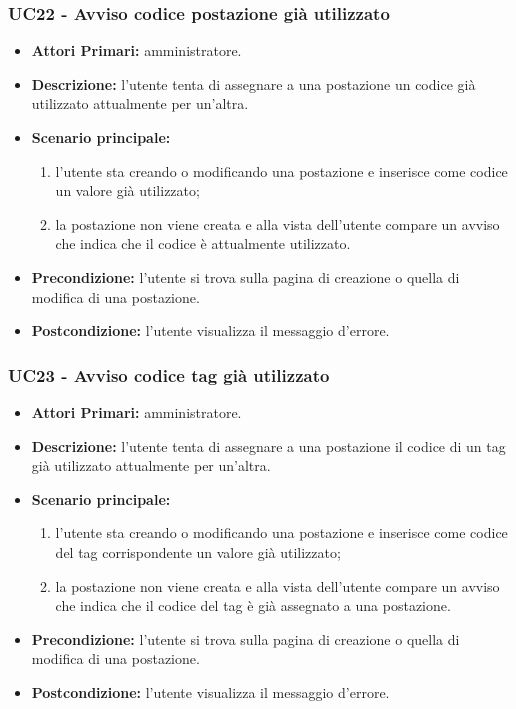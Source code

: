 \subsubsection{UC22 - Avviso codice postazione già utilizzato}
\begin{itemize}
	\item\textbf{Attori Primari:}
	amministratore.
	\item\textbf{Descrizione:}
	l'utente tenta di assegnare a una postazione un codice già utilizzato attualmente per un'altra.
	\item\textbf{Scenario principale:}
	\begin{enumerate}
		\item l'utente sta creando o modificando una postazione e inserisce come codice un valore già utilizzato;
		\item la postazione non viene creata e alla vista dell'utente compare un avviso che indica che il codice è attualmente utilizzato.
	\end{enumerate}
	\item\textbf{Precondizione:}
	l'utente si trova sulla pagina di creazione o quella di modifica di una postazione.
	\item\textbf{Postcondizione:}
	l'utente visualizza il messaggio d'errore.
\end{itemize}

\subsubsection{UC23 - Avviso codice tag già utilizzato}
\begin{itemize}
	\item\textbf{Attori Primari:}
	amministratore.
	\item\textbf{Descrizione:}
	l'utente tenta di assegnare a una postazione il codice di un tag già utilizzato attualmente per un'altra.
	\item\textbf{Scenario principale:}
	\begin{enumerate}
		\item l'utente sta creando o modificando una postazione e inserisce come codice del tag corrispondente un valore già utilizzato;
		\item la postazione non viene creata e alla vista dell'utente compare un avviso che indica che il codice del tag è già assegnato a una postazione.
	\end{enumerate}
	\item\textbf{Precondizione:}
	l'utente si trova sulla pagina di creazione o quella di modifica di una postazione.
	\item\textbf{Postcondizione:}
	l'utente visualizza il messaggio d'errore.
\end{itemize}

